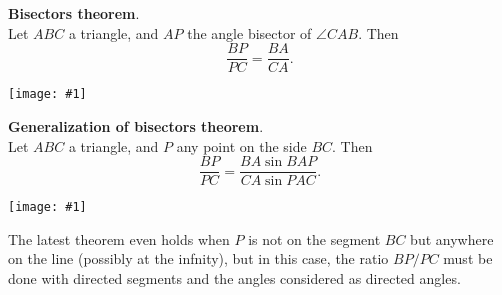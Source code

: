 \documentclass[12pt]{article}
\newcommand{\figuraex}[2]{\begin{center}\texttt{[image: \#1]}\end{center}}
\begin{document}
\textbf{Bisectors theorem}.\\
Let $ABC$ a triangle, and $AP$ the angle bisector of $\angle CAB$. Then
\[
\frac{BP}{PC}=\frac{BA}{CA}.
\]
\figuraex{bisector}{scale=0.75}
\bigskip

\textbf{Generalization of bisectors theorem}.\\
Let $ABC$ a triangle, and $P$ any point on the side $BC$. Then
\[
\frac{BP}{PC} = \frac{BA \sin BAP}{CA \sin PAC}.
\]
\figuraex{genbisector}{scale=0.75}

The latest theorem even holds when $P$ is not on the segment $BC$ but anywhere on the line (possibly at the infnity), but in this case, the ratio $BP/PC$ must be done with directed segments and the angles considered as directed angles.
\end{document}
